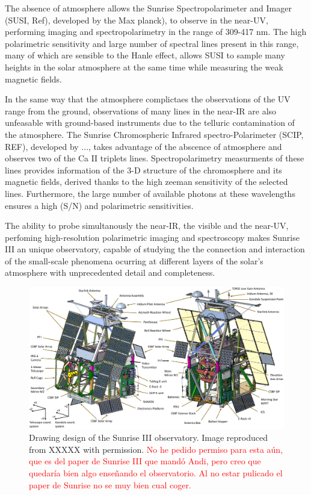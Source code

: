 The absence of atmosphere allows the Sunrise Spectropolarimeter and Imager (SUSI, Ref), developed by the Max planck), to observe in the near-UV, performing imaging and spectropolarimetry in the range of 309-417 nm. The high polarimetric sensitivity and large number of spectral lines present in this range, many of which are sensible to the Hanle effect, allows SUSI to sample many heights in the solar atmosphere at the same time while measuring the weak magnetic fields. 

In the same way that the atmosphere complictaes the observations of the UV range from the ground, observations of many lines in the near-IR are also unfeasable with ground-based instruments due to the telluric contamination of the atmosphere. The Sunrise Chromospheric Infrared spectro-Polarimeter (SCIP, REF), developed by ...,  takes advantage of the abscence of atmosphere and observes two of the Ca II triplets lines. Spectropolarimetry measurments of these lines provides information of the 3-D structure of the chromosphere and its magnetic fields, derived thanks to the high zeeman sensitivity of the selected lines. Furthermore, the large number of available photons at these wavelengths ensures a high (S/N) and polarimetric sensitivities. 

The ability to probe simultanously the near-IR, the visible and the near-UV, perfoming high-resolution polarimetric imaging and spectroscopy makes Sunrise III an unique observatory, capable of studying the the connection  and interaction of the small-scale phenomena ocurring at different layers of the solar's atmosphere with unprecedented detail and completeness. 

\begin{figure}
    \includegraphics[width=\textwidth]{figures/TuMag/Sunrise_schematic.png}
    \caption{
      Drawing design of the Sunrise III observatory. Image reproduced from XXXXX with permission. \textcolor{red}{No he pedido permiso para esta aún, que es del paper de Sunrise III que mandó Andi, pero creo que quedaría bien algo enseñando el observatorio. Al no estar pulicado el paper de Sunrise no se muy bien cual coger.}}
      \label{fig: SunriseIII}
\end{figure}

